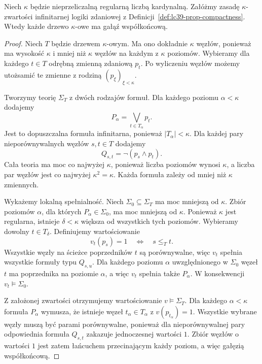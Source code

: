 \begin{twierdzenie}
\label{thm:lc39-compactness-to-tree}
Niech $\kappa$ będzie
nieprzeliczalną regularną
liczbą kardynalną.
Załóżmy zasadę
$\kappa$-zwartości
infinitarnej logiki zdaniowej
z Definicji~\ref{def:lc39-prop-compactness}.
Wtedy każde drzewo
$\kappa$-owe ma gałąź
współkońcową.
\end{twierdzenie}
\begin{proof}
Niech $T$ będzie drzewem
$\kappa$-owym.
Ma ono dokładnie
$\kappa$ węzłów,
ponieważ ma wysokość $\kappa$
i mniej niż $\kappa$ węzłów
na każdym z $\kappa$ poziomów.
Wybieramy dla każdego
$t\in T$ odrębną zmienną
zdaniową $p_t$.
Po wyliczeniu węzłów
możemy utożsamić te zmienne
z rodziną $(p_\xi)_{\xi<\kappa}$.

Tworzymy teorię $\Sigma_T$
z dwóch rodzajów formuł.
Dla każdego poziomu
$\alpha<\kappa$ dodajemy
\[
 P_\alpha=
 \bigvee_{t\in T_\alpha}p_t.
\]
Jest to dopuszczalna formuła
infinitarna, ponieważ
$|T_\alpha|<\kappa$.
Dla każdej pary
nieporównywalnych węzłów
$s,t\in T$ dodajemy
\[
 Q_{s,t}=\neg(p_s\land p_t).
\]
Cała teoria ma moc
co najwyżej $\kappa$,
ponieważ liczba poziomów
wynosi $\kappa$,
a liczba par węzłów
jest co najwyżej
$\kappa^2=\kappa$.
Każda formuła zależy od
mniej niż $\kappa$ zmiennych.

Wykażemy lokalną spełnialność.
Niech $\Sigma_0\subseteq\Sigma_T$
ma moc mniejszą od $\kappa$.
Zbiór poziomów $\alpha$,
dla których
$P_\alpha\in\Sigma_0$,
ma moc mniejszą od $\kappa$.
Ponieważ $\kappa$ jest regularna,
istnieje $\delta<\kappa$
większa od wszystkich
tych poziomów.
Wybieramy dowolny
$t\in T_\delta$.
Definiujemy wartościowanie
\[
 v_t(p_s)=1
   \quad\Longleftrightarrow\quad s\le_T t.
\]
Wszystkie węzły na ścieżce
poprzedników $t$ są
porównywalne, więc
$v_t$ spełnia wszystkie
formuły typu $Q_{s,u}$.
Dla każdego poziomu
$\alpha$ uwzględnionego
w $\Sigma_0$ węzeł $t$
ma poprzednika na poziomie
$\alpha$, a więc
$v_t$ spełnia także
$P_\alpha$.
W konsekwencji
$v_t\models\Sigma_0$.

Z założonej zwartości
otrzymujemy wartościowanie
$v\models\Sigma_T$.
Dla każdego $\alpha<\kappa$
formuła $P_\alpha$ wymusza,
że istnieje węzeł
$t_\alpha\in T_\alpha$
z $v(p_{t_\alpha})=1$.
Wszystkie wybrane węzły
muszą być parami
porównywalne, ponieważ
dla nieporównywalnej pary
odpowiednia formuła
$Q_{s,t}$ zakazuje
jednoczesnej wartości $1$.
Zbiór węzłów o wartości $1$
jest zatem łańcuchem
przecinającym każdy poziom,
a więc gałęzią
współkońcową.
\end{proof}

